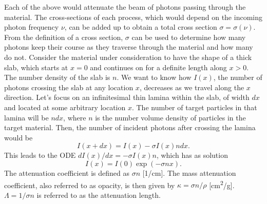 \documentclass[a4paper,11pt]{report}
\begin{document}
Each of the above would attenuate the beam of photons passing through the material. The cross-sections of each process, which would depend on the incoming photon frequency $\nu$, can be added up to obtain a total cross section $\sigma = \sigma(\nu)$. From the definition of a cross section, $\sigma$ can be used to determine how many photons keep their course as they traverse through the material and how many do not. Consider the material under consideration to have the shape of a thick slab, which starts at $x=0$ and continues on for a definite length along $x>0$. The number density of the slab is $n$. We want to know how $I(x)$, the number of photons crossing the slab at any location $x$, decreases as we travel along the $x$ direction. Let's focus on an infinitesimal thin lamina within the slab, of width $dx$ and located at some arbitrary location $x$. The number of target particles in that lamina will be $n dx$, where $n$ is the number volume density of particles in the target material. Then, the number of incident photons after crossing the lamina would be
\begin{equation}
    I(x+dx) = I(x) -\sigma I(x) n dx.
\end{equation}
This leads to the ODE $dI(x)/dx = -\sigma I(x) n$, which has as solution
\begin{equation}
    I(x) = I(0) \exp(-\sigma n x).
\end{equation}
The attenuation coefficient is defined as $\sigma n$ [1/cm]. The mass attenuation coefficient, also referred to as opacity, is then given by $\kappa = \sigma n / \rho$ [cm\textsuperscript{2}/g]. $\Lambda = 1 / \sigma n$ is referred to as the attenuation length. 
\end{document}
